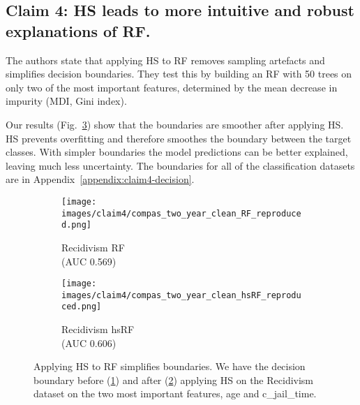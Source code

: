 \subsection{Claim 4: HS leads to more intuitive and robust explanations of RF.}

The authors state that applying HS to RF removes sampling artefacts and simplifies decision boundaries. They test this by building an RF with 50 trees on only two of the most important features, determined by the mean decrease in impurity (MDI, Gini index).

Our results (Fig.~\ref{fig:claim4-boundary}) show that the boundaries are smoother after applying HS. HS prevents overfitting and therefore smoothes the boundary between the target classes. With simpler boundaries the model predictions can be better explained, leaving much less uncertainty. The boundaries for all of the classification datasets are in Appendix~\ref{appendix:claim4-decision}.

\begin{figure}[hbt]
    \centering
    \begin{subfigure}[b]{0.45\textwidth}
        \centering
        \texttt{[image: images/claim4/compas\_two\_year\_clean\_RF\_reproduced.png]}
        \caption{Recidivism RF \\ (AUC 0.569)}
        \label{fig:rrf}
    \end{subfigure}
    \begin{subfigure}[b]{0.45\textwidth}
        \centering
        \texttt{[image: images/claim4/compas\_two\_year\_clean\_hsRF\_reproduced.png]}
        \caption{Recidivism hsRF \\ (AUC 0.606)}
        \label{fig:rhsrf}
    \end{subfigure}

    \caption{Applying HS to RF simplifies boundaries. We have the decision boundary before (\ref{fig:rrf}) and after (\ref{fig:rhsrf}) applying HS on the Recidivism dataset on the two most important features, age and c\_jail\_time. %
    }
    \label{fig:claim4-boundary}
\end{figure}

